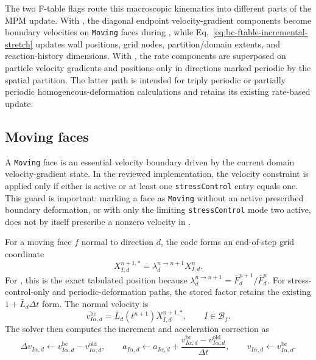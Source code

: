 The two F-table flags route this macroscopic kinematics into different parts of the MPM update.  With , the diagonal endpoint velocity-gradient components become boundary velocities on \texttt{Moving} faces during , while Eq.~\eqref{eq:bc-ftable-incremental-stretch} updates wall positions, grid nodes, partition/domain extents, and reaction-history dimensions.  With , the rate components are superposed on particle velocity gradients and positions only in directions marked periodic by the spatial partition.  The latter path is intended for triply periodic or partially periodic homogeneous-deformation calculations and retains its existing rate-based update.

\subsection{Moving faces}
\label{subsec:bc-moving}

A \texttt{Moving} face is an essential velocity boundary driven by the current domain velocity-gradient state.  In the reviewed implementation, the velocity constraint is applied only if either  is active or at least one \texttt{stressControl} entry equals one.  This guard is important: marking a face as \texttt{Moving} without an active prescribed boundary deformation, or with only the limiting \texttt{stressControl} mode two active, does not by itself prescribe a nonzero velocity in .

For a moving face $f$ normal to direction $d$, the code forms an end-of-step grid coordinate
\begin{equation}
  X_{I,d}^{n+1,*}=\lambda_d^{n\rightarrow n+1}X_{I,d}^{n}.
  \label{eq:bc-moving-exact-position}
\end{equation}
For , this is the exact tabulated position because $\lambda_d^{n\rightarrow n+1}=\bar F_d^{n+1}/\bar F_d^n$.  For stress-control-only and periodic-deformation paths, the stored factor retains the existing $1+\bar L_d\Delta t$ form.  The normal velocity is
\begin{equation}
  v_{I\alpha,d}^{\mathrm{bc}} = \bar L_d(t^{n+1}) X_{I,d}^{n+1,*},
  \qquad I\in\mathcal{B}_f.
  \label{eq:bc-moving-normal-velocity}
\end{equation}
The solver then computes the increment and acceleration correction as
\begin{equation}
  \Delta v_{I\alpha,d} \leftarrow v_{I\alpha,d}^{\mathrm{bc}}-v_{I\alpha,d}^{\mathrm{old}},
  \qquad
  a_{I\alpha,d} \leftarrow a_{I\alpha,d}+\frac{v_{I\alpha,d}^{\mathrm{bc}}-v_{I\alpha,d}^{\mathrm{old}}}{\Delta t},
  \qquad
  v_{I\alpha,d}\leftarrow v_{I\alpha,d}^{\mathrm{bc}}.
  \label{eq:bc-moving-normal-correction}
\end{equation}

